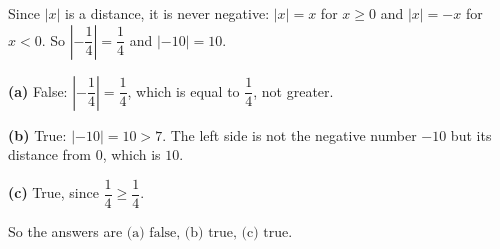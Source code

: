 Since $|x|$ is a distance, it is never negative: $|x|=x$ for $x\ge0$ and $|x|=-x$ for $x<0$. So $\left|-\dfrac{1}{4}\right|=\dfrac{1}{4}$ and $|-10|=10$.

\textbf{(a)} False: $\left|-\dfrac{1}{4}\right|=\dfrac{1}{4}$, which is equal to $\dfrac{1}{4}$, not greater.

\textbf{(b)} True: $|-10|=10>7$. The left side is not the negative number $-10$ but its distance from $0$, which is $10$.

\textbf{(c)} True, since $\dfrac{1}{4}\ge\dfrac{1}{4}$.

So the answers are $\boxed{\text{(a) false, (b) true, (c) true}}$.
